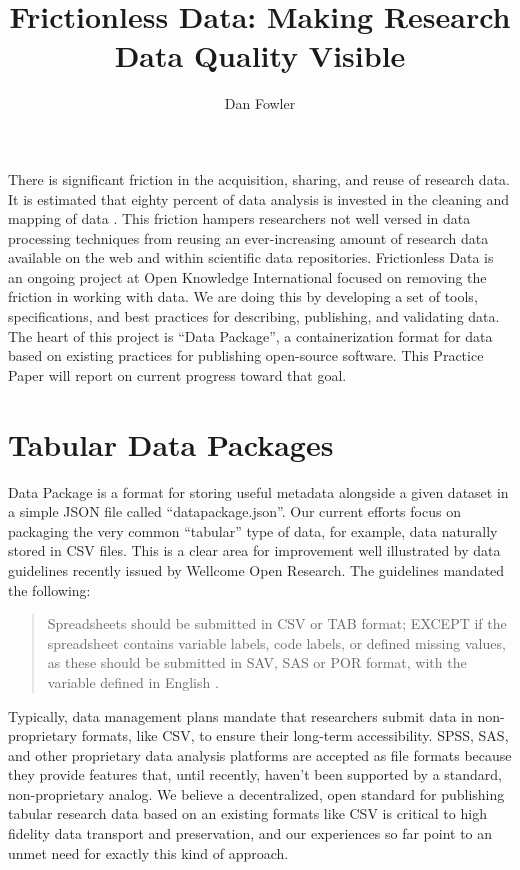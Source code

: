 \documentclass{idcc}
\title{Frictionless Data: Making Research Data Quality Visible}
\author{Dan Fowler}
\affil{Open Knowledge International}
\begin{document}
\maketitle

There is significant friction in the acquisition, sharing, and reuse
of research data.  It is estimated that eighty percent of data
analysis is invested in the cleaning and mapping of data
\cite{dasujohnson2003}.  This friction hampers researchers not well
versed in data processing techniques from reusing an ever-increasing
amount of research data available on the web and within scientific
data repositories.  Frictionless Data is an ongoing project at Open
Knowledge International focused on removing the friction in working
with data. We are doing this by developing a set of tools,
specifications, and best practices for describing, publishing, and
validating data. The heart of this project is ``Data Package'', a
containerization format for data based on existing practices for
publishing open-source software.  This Practice Paper will report on
current progress toward that goal.

\section{Tabular Data Packages}
Data Package is a format for storing useful metadata alongside a given
dataset in a simple JSON file called ``datapackage.json''.  Our
current efforts focus on packaging the very common ``tabular'' type of
data, for example, data naturally stored in CSV files.  This is a
clear area for improvement well illustrated by data guidelines
recently issued by Wellcome Open Research.  The guidelines mandated
the following:

\begin{quote}
Spreadsheets should be submitted in CSV or TAB format; EXCEPT if the
spreadsheet contains variable labels, code labels, or defined missing
values, as these should be submitted in SAV, SAS or POR format, with
the variable defined in English \cite{wellcomeopenresearch2016}.
\end{quote}

Typically, data management plans mandate that researchers submit data
in non-proprietary formats, like CSV, to ensure their long-term
accessibility.  SPSS, SAS, and other proprietary data analysis
platforms are accepted as file formats because they provide features
that, until recently, haven't been supported by a standard,
non-proprietary analog.  We believe a decentralized, open standard for
publishing tabular research data based on an existing formats like CSV
is critical to high fidelity data transport and preservation, and our
experiences so far point to an unmet need for exactly this kind of
approach.
\end{document}
